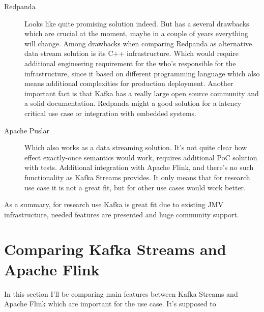 \begin{description}
    \item[Redpanda] Looks like quite promising solution indeed.
    But has a several drawbacks which are crucial at the moment, maybe in
    a couple of years everything will change.
    Among drawbacks when comparing Redpanda as alternative data stream solution
    is its C++ infrastructure.
    Which would require additional engineering requirement for the who's
    responsible for the infrastructure, since it based on different programming
    language which also means additional complexities for production deployment.
    Another important fact is that Kafka has a really large open source community
    and a solid documentation.
    Redpanda might a good solution for a latency critical use case or integration with
    embedded systems.
    \item[Apache Puslar] Which also works as a data streaming solution.
    It's not quite clear how effect exactly-once semantics would work,
    requires additional PoC solution with tests.
    Additional integration with Apache Flink, and there's no such functionality
    as Kafka Streams provides.
    It only means that for research use case it is not a great fit, but for other use cases
    would work better.
\end{description}

As a summary, for research use Kafka is great fit due to existing JMV
infrastructure, needed features are presented and huge community support.


\newpage
\section{Comparing Kafka Streams and Apache Flink}\label{sec:kafka-vs-flink}
In this section I'll be comparing main features between Kafka Streams and Apache Flink
which are important for the use case.
It's supposed to
